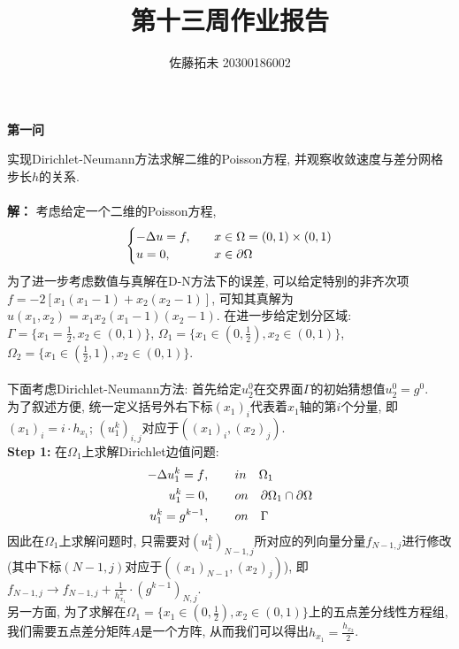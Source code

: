 \documentclass[12pt]{article}
\title{第十三周作业报告}
\author{佐藤拓未 20300186002}
\date{}
\begin{document}
	
	
	
	
	\maketitle
	
	
	\begin{center}
		\textbf{第一问}
	\end{center}
\noindent 实现Dirichlet-Neumann方法求解二维的Poisson方程, 并观察收敛速度与差分网格步长$h$的关系.\\
\quad \\
\textbf{解：} 考虑给定一个二维的Poisson方程, 
\begin{align*}
	\begin{cases}
		-\Delta u = f,\quad & x \in \Omega = (0,1)\times(0,1)\\
		u = 0, &x\in {\rm \partial}\Omega 
	\end{cases}
\end{align*}
\noindent 为了进一步考虑数值与真解在D-N方法下的误差, 可以给定特别的非齐次项$f=-2[x_1(x_1-1)+x_2(x_2-1)]$, 可知其真解为$u(x_1,x_2)=x_1x_2(x_1-1)(x_2-1)$. 在进一步给定划分区域: $\Gamma = \{x_1=\frac{1}{2},x_2\in(0,1)\}$, $\Omega_1=\{ x_1 \in(0,\frac{1}{2}), x_2 \in(0,1)       \}$, $\Omega_2 = \{x_1 \in(\frac{1}{2},1),x_2\in(0,1)\}$.\\
\quad \\
下面考虑Dirichlet-Neumann方法: 首先给定$u_2^0$在交界面$\Gamma$的初始猜想值$u_2^0=g^0$.\\
为了叙述方便, 统一定义括号外右下标$(x_1)_i$代表着$x_1$轴的第$i$个分量, 即$(x_1)_i=i\cdot h_{x_1}$; $(u_1^k)_{i,j}$对应于$((x_1)_i,(x_2)_j)$.\\
\textbf{Step 1:} 在$\Omega_1$上求解Dirichlet边值问题:
\begin{align*}
	-\Delta u_1^k =f&,\quad \quad  in \quad \Omega_1\\
	u_1^k=0&,\quad \quad  on \quad   {\rm \partial}\Omega_1 \cap {\rm \partial}\Omega\\
	u_1^k=g^{k-1}&, \quad \quad on \quad \Gamma 
\end{align*}
\noindent 因此在$\Omega_1$上求解问题时, 只需要对$(u^k_1)_{N-1,j}$所对应的列向量分量$f_{N-1,j}$进行修改(其中下标$(N-1,j)$对应于$((x_1)_{N-1},(x_2)_{j})$), 即$f_{N-1,j}\rightarrow f_{N-1,j}+\frac{1}{h_{x_1}^2}\cdot (g^{k-1})_{N,j}$.\\
另一方面, 为了求解在$\Omega_1=\{ x_1 \in(0,\frac{1}{2}), x_2 \in(0,1)       \}$上的五点差分线性方程组, 我们需要五点差分矩阵$A$是一个方阵, 从而我们可以得出$h_{x_1}=\frac{h_{x_2}}{2}$.
\end{document}
